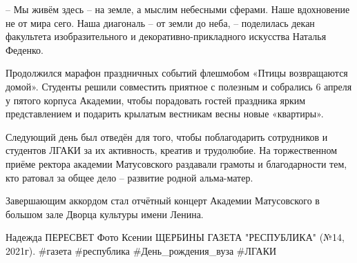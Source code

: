 – Мы живём здесь – на земле, а мыслим небесными сферами. Наше вдохновение не от мира сего. Наша диагональ – от земли до неба, – поделилась декан факультета изобразительного и декоративно-прикладного искусства Наталья Феденко.

Продолжился марафон праздничных событий флешмобом «Птицы возвращаются домой».
Студенты решили совместить приятное с полезным и собрались 6 апреля у пятого
корпуса Академии, чтобы порадовать гостей праздника ярким представлением и
подарить крылатым вестникам весны новые «квартиры».

Следующий день был отведён для того, чтобы поблагодарить сотрудников и
студентов ЛГАКИ за их активность, креатив и трудолюбие. На торжественном приёме
ректора академии Матусовского раздавали грамоты и благодарности тем, кто
ратовал за общее дело – развитие родной альма-матер.

Завершающим аккордом стал отчётный концерт Академии Матусовского в большом зале
Дворца культуры имени Ленина.

Надежда ПЕРЕСВЕТ
Фото Ксении ЩЕРБИНЫ
ГАЗЕТА "РЕСПУБЛИКА" (№14, 2021г).
#газета #республика #День_рождения_вуза #ЛГАКИ
